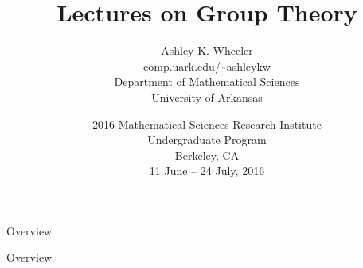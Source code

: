 \documentclass[t,10pt,aspectratio=2516,envcountsect]{beamer}
\title[Group Theory]{
	Lectures on Group Theory 
	}
\subtitle{}
\author[Ashley K. Wheeler]{
	{\large Ashley K. Wheeler} \\
	\vspace{0.5pc}
	{\small
	\url{comp.uark.edu/~ashleykw} \\
	Department of Mathematical Sciences \\
	University of Arkansas}
	}
\institute[UArk]{}
\date[2016 MSRI-UP]{\small
	2016 Mathematical Sciences Research Institute \\
	Undergraduate Program \\
	\smallGap
	Berkeley, CA \\ 
	11 June -- 24 July,  2016 \\
	
	}
\numberwithin{subsection}{section}
\numberwithin{theorem}{subsection}
\numberwithin{equation}{section}
\numberwithin{figure}{section}
\theoremstyle{plain}
\theoremstyle{definition}
\newcommand{\1}{^{-1}}
\newcommand{\smallGap}{\vspace{0.75pc}}
\begin{document}
{

\begin{frame}
\titlepage
\end{frame}

\begin{frame}{Overview}
\begin{multicols}{2}
\tableofcontents[sections={1-5}]
\end{multicols}
\end{frame}

\begin{frame}{Overview}
\begin{multicols}{2}
\tableofcontents[sections={6-10}]
\end{multicols}
\end{frame}

}
%
%
%











\end{document}
